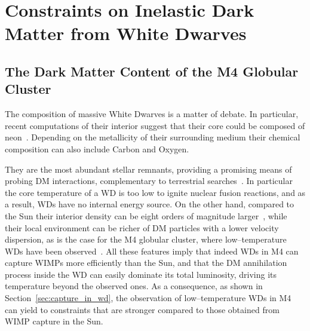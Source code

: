 \documentclass[11pt]{article}
\begin{document}
\section{Constraints on Inelastic Dark Matter from White Dwarves}
\label{sec:capture}

\subsection{The Dark Matter Content of the M4 Globular Cluster}
\label{sec:wd_in_gc}
The composition of massive White Dwarves is a matter of debate. In particular, recent computations of their interior suggest that their core could be composed of neon~\cite{neon_WD}. Depending on the metallicity of their surrounding medium their chemical composition can also include Carbon and Oxygen.

They are the most abundant stellar remnants, providing a promising means of probing DM interactions, complementary to terrestrial searches~\cite{dm_cap_WD_Dasgupta2019, improved_WD_2021}. In particular the core temperature of a WD is too low to ignite nuclear fusion reactions, and as a result, WDs have no internal energy source. On the other hand, compared to the Sun their interior density can be eight orders of magnitude larger~\cite{improved_WD_2021}, while their local environment can be richer of DM particles with a lower velocity dispersion, as is the case for the M4 globular cluster, where low--temperature WDs have been observed~\cite{idm_wd_2010}. All these features imply that indeed WDs in M4 can capture WIMPs more efficiently than the Sun, and that the DM annihilation process inside the WD can easily dominate its total luminosity, driving its temperature beyond the observed ones. As a consequence, as shown in Section~\ref{sec:capture_in_wd}, the observation of low--temperature WDs in M4 can yield to constraints that are stronger compared to those obtained from  WIMP capture in the Sun.
\end{document}
